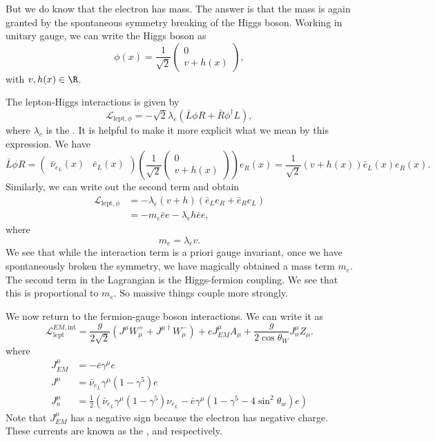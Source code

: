 \documentclass[a4paper]{article}
\begin{document}
But we do know that the electron has mass. The answer is that the mass is again granted by the spontaneous symmetry breaking of the Higgs boson. Working in unitary gauge, we can write the Higgs boson as
\[
  \phi(x) = \frac{1}{\sqrt{2}}
  \begin{pmatrix}
    0\\
    v + h(x)
  \end{pmatrix},
\]
with $v, h(x) \in \R$.

The lepton-Higgs interactions is given by
\[
  \mathcal{L}_{\mathrm{lept}, \phi} = - \sqrt{2} \lambda_e (\bar L \phi R + \bar R \phi^\dagger L),
\]
where $\lambda_e$ is the . It is helpful to make it more explicit what we mean by this expression. We have
\[
  \bar{L} \phi R =
  \begin{pmatrix}
    \bar{\nu}_{e_L}(x) & \bar{e}_L(x)
  \end{pmatrix}
  \left(
  \frac{1}{\sqrt{2}}
  \begin{pmatrix}
    0\\
    v + h(x)
  \end{pmatrix}
  \right)
  e_R(x) = \frac{1}{\sqrt{2}} (v + h(x)) \bar{e}_L(x) e_R(x).
\]
Similarly, we can write out the second term and obtain
\begin{align*}
  \mathcal{L}_{\mathrm{lept}, \phi} &= - \lambda_e (v + h) (\bar{e}_L e_R + \bar{e}_R e_L)\\
  &= - m_e \bar{e} e - \lambda_e h \bar{e} e,
\end{align*}
where
\[
  m_e = \lambda_e v.
\]
We see that while the interaction term is a priori gauge invariant, once we have spontaneously broken the symmetry, we have magically obtained a mass term $m_e$. The second term in the Lagrangian is the Higgs-fermion coupling. We see that this is proportional to $m_e$. So massive things couple more strongly.

We now return to the fermion-gauge boson interactions. We can write it as
\[
  \mathcal{L}_{\mathrm{lept}}^{EM, \mathrm{int}} = \frac{g}{2\sqrt{2}} (J^\mu W_\mu^+ + J^{\mu\dagger} W_\mu^-) + e J_{EM}^\mu A_\mu + \frac{g}{2 \cos \theta_W} J_n^\mu Z_\mu.
\]
where
\begin{align*}
  J^\mu_{EM} &= - \bar{e} \gamma^\mu e\\
  J^\mu &= \bar{\nu}_{e_L}\gamma^\mu (1 - \gamma^5) e\\
  J^\mu_n &= \frac{1}{2} \left(\bar{\nu}_{e_L} \gamma^\mu (1 - \gamma^5) \nu_{e_L} - \bar{e} \gamma^\mu (1 - \gamma^5 - 4 \sin^2 \theta_w)e\right)
\end{align*}
Note that $J^\mu_{EM}$ has a negative sign because the electron has negative charge. These currents are known as the ,  and  respectively.
\end{document}
